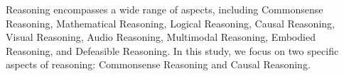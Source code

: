 Reasoning encompasses a wide range of aspects, including Commonsense Reasoning, 
Mathematical Reasoning, Logical Reasoning, Causal Reasoning, Visual Reasoning, 
Audio Reasoning, Multimodal Reasoning, Embodied Reasoning, and Defeasible Reasoning. 
In this study, we focus on two specific aspects of reasoning: Commonsense Reasoning 
and Causal Reasoning.



















